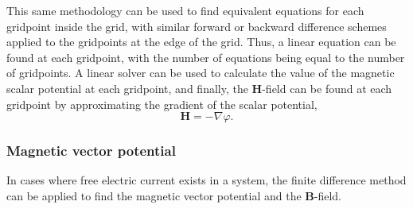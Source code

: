 This same methodology can be used to find equivalent equations for each gridpoint inside the grid, with similar forward or backward difference schemes applied to the gridpoints at the edge of the grid. Thus, a linear equation can be found at each gridpoint, with the number of equations being equal to the number of gridpoints. A linear solver can be used to calculate the value of the magnetic scalar potential at each gridpoint, and finally, the \(\mathbf{H}\)-field can be found at each gridpoint by approximating the gradient of the scalar potential,
\begin{equation}
    \mathbf{H} = -\nabla \varphi \text{.}
\end{equation}

\subsubsection{Magnetic vector potential}
In cases where free electric current exists in a system, the finite difference method can be applied to find the magnetic vector potential and the \(\mathbf{B}\)-field.


